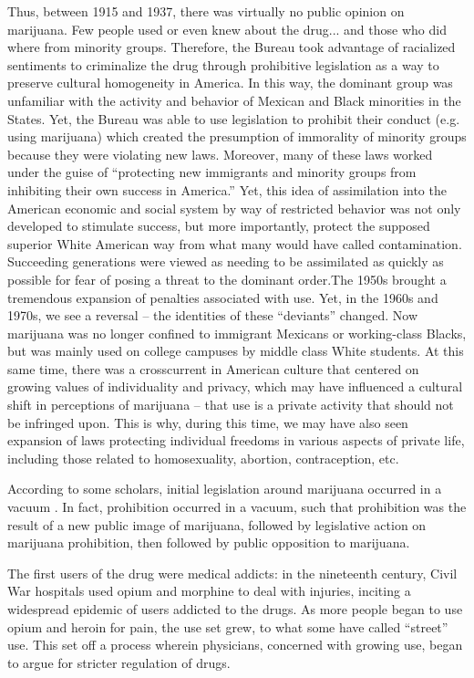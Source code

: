 Thus, between 1915 and 1937, there was virtually no public opinion on marijuana. Few people used or even knew about the drug... and those who did where from minority groups. Therefore, the Bureau took advantage of racialized sentiments to criminalize the drug through prohibitive legislation as a way to preserve cultural homogeneity in America. In this way, the dominant group was unfamiliar with the activity and behavior of Mexican and Black minorities in the States. Yet, the Bureau was able to use legislation to prohibit their conduct (e.g. using marijuana) which created the presumption of immorality of minority groups because they were violating new laws. Moreover, many of these laws worked under the guise of ``protecting new immigrants and minority groups from inhibiting their own success in America.'' Yet, this idea of assimilation into the American economic and social system by way of restricted behavior was not only developed to stimulate success, but more importantly, protect the supposed superior White American way from what many would have called contamination. Succeeding generations were viewed as needing to be assimilated as quickly as possible for fear of posing a threat to the dominant order.The 1950s brought a tremendous expansion of penalties associated with use. Yet, in the 1960s and 1970s, we see a reversal -- the identities of these ``deviants'' changed. Now marijuana was no longer confined to immigrant Mexicans or working-class Blacks, but was mainly used on college campuses by middle class White students. At this same time, there was a crosscurrent in American culture that centered on growing values of individuality and privacy, which may have influenced a cultural shift in perceptions of marijuana -- that use is a private activity that should not be infringed upon. This is why, during this time, we may have also seen expansion of laws protecting individual freedoms in various aspects of private life, including those related to homosexuality, abortion, contraception, etc. 




According to some scholars, initial legislation around marijuana occurred in a vacuum \citep{bonnie_and_whitebread_1970}. In fact, prohibition occurred in a vacuum, such that prohibition was the result of a new public image of marijuana, followed by legislative action on marijuana prohibition, then followed by public opposition to marijuana. 

The first users of the drug were medical addicts: in the nineteenth century, Civil War hospitals used opium and morphine to deal with injuries, inciting a widespread epidemic of users addicted to the drugs. As more people began to use opium and heroin for pain, the use set grew, to what some have called ``street'' use. This set off a process wherein physicians, concerned with growing use, began to argue for stricter regulation of drugs. 

